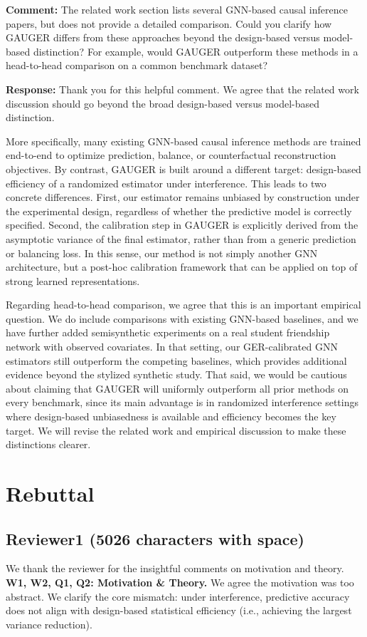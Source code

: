 \documentclass{article}
\theoremstyle{plain}
\theoremstyle{definition}
\theoremstyle{remark}
\begin{document}
\noindent\textbf{Comment:} The related work section lists several GNN-based causal inference papers, but does not provide a detailed comparison. Could you clarify how GAUGER differs from these approaches beyond the design-based versus model-based distinction? For example, would GAUGER outperform these methods in a head-to-head comparison on a common benchmark dataset?

\noindent\textbf{Response:} Thank you for this helpful comment. We agree that the related work discussion should go beyond the broad design-based versus model-based distinction.

More specifically, many existing GNN-based causal inference methods are trained end-to-end to optimize prediction, balance, or counterfactual reconstruction objectives. By contrast, GAUGER is built around a different target: design-based efficiency of a randomized estimator under interference. This leads to two concrete differences. First, our estimator remains unbiased by construction under the experimental design, regardless of whether the predictive model is correctly specified. Second, the calibration step in GAUGER is explicitly derived from the asymptotic variance of the final estimator, rather than from a generic prediction or balancing loss. In this sense, our method is not simply another GNN architecture, but a post-hoc calibration framework that can be applied on top of strong learned representations.

Regarding head-to-head comparison, we agree that this is an important empirical question. We do include comparisons with existing GNN-based baselines, and we have further added semisynthetic experiments on a real student friendship network with observed covariates. In that setting, our GER-calibrated GNN estimators still outperform the competing baselines, which provides additional evidence beyond the stylized synthetic study. That said, we would be cautious about claiming that GAUGER will uniformly outperform all prior methods on every benchmark, since its main advantage is in randomized interference settings where design-based unbiasedness is available and efficiency becomes the key target. We will revise the related work and empirical discussion to make these distinctions clearer.
\section{Rebuttal}
\subsection{Reviewer1 (5026 characters  with space)}
 We thank the reviewer for the insightful comments on motivation and theory. 
\vspace{0.5em}
\noindent\textbf{W1, W2, Q1, Q2: Motivation \& Theory.}
We agree the motivation was too abstract. We clarify the core mismatch: under interference,  predictive accuracy does not align with design-based statistical efficiency (i.e., achieving the largest variance reduction). 
\end{document}
